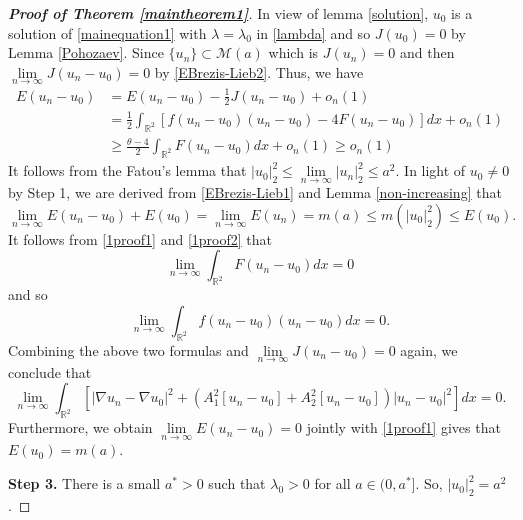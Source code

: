 \documentclass[11pt]{amsart}
\numberwithin{equation}{section}
\theoremstyle{definition}
\newcommand{\R}{\mathbb{R}}
\begin{document}
\begin{proof}[\emph{\textbf{Proof of Theorem \ref{maintheorem1}}}]
In view of lemma \ref{solution}, $u_0$ is a solution of \eqref{mainequation1}
with $\lambda=\lambda_0$ in \eqref{lambda} and so $J(u_0)=0$ by Lemma \ref{Pohozaev}.
Since $\{u_n\}\subset \mathcal{M}(a)$ which is $J(u_n)=0$
and then $\lim\limits_{n\to\infty}J(u_n-u_0)=0$ by \eqref{EBrezis-Lieb2}.
Thus, we have
\begin{align}\label{1proof1}
\nonumber E(u_n-u_0)&  =E(u_n-u_0)-\frac12 J(u_n-u_0) +o_n(1)\\
\nonumber   &= \frac{1}{2}\int_{\R^{2}}\left[f(u_n-u_0)(u_n-u_0)-4 F(u_n-u_0)\right]dx +o_n(1)\\
   &  \geq \frac{\theta-4}{2}\int_{\R^{2}} F(u_n-u_0) dx+o_n(1)\geq o_n(1)
\end{align}
It follows from the Fatou's lemma that $|u_0|_2^2\leq \lim\limits_{n\to\infty}|u_n|_2^2\leq a^2$.
In light of $u_0\neq0$ by Step 1, we are derived from \eqref{EBrezis-Lieb1} and Lemma \ref{non-increasing} that
\begin{equation}\label{1proof2}
  \lim_{n\to\infty}E(u_n-u_0)+E(u_0)=\lim_{n\to\infty}E(u_n)=m(a)\leq m(|u_0|_2^2)\leq E(u_0).
\end{equation}
 It follows from \eqref{1proof1} and \eqref{1proof2} that
 \[
\lim_{n\to\infty}\int_{\R^{2}} F(u_n-u_0) dx=0
\]
and so
\[
\lim_{n\to\infty}\int_{\R^{2}} f(u_n-u_0) (u_n-u_0)dx=0.
\]
Combining the above two formulas and $\lim\limits_{n\to\infty}J(u_n-u_0)=0$ again,
we conclude that
\[
\lim_{n\to\infty}\int_{\R^{2}}[ |\nabla u_n-\nabla u_0|^2+(A_1^2[u_n-u_0]+A_2^2[u_n-u_0])|u_n-u_0|^2]dx=0.
\]
Furthermore, we obtain
$\lim\limits_{n\to\infty}E(u_n-u_0)=0$ jointly with \eqref{1proof1} gives that $E(u_0)=m(a)$.

\textbf{Step 3.} There is a small $a^*>0$ such that $\lambda_0>0$ for all $a\in(0,a^*]$.
So, $|u_0|_2^2=a^2$.


\end{proof}
\end{document}
